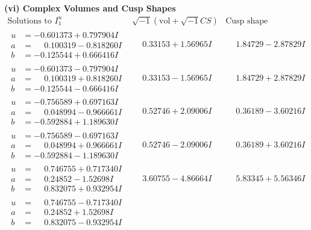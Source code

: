 \documentclass[1p]{elsarticle_modified}
\theoremstyle{definition}
\newcommand{\I}{\sqrt{-1}}
\begin{document}
\newpage\flushleft \textbf{(vi) Complex Volumes and Cusp Shapes}
$$\begin{array}{c|c|c}  
\text{Solutions to }I^u_{1}& \I (\text{vol} + \sqrt{-1}CS) & \text{Cusp shape}\\
 \hline 
\begin{aligned}
u &= -0.601373 + 0.797904 I \\
a &= \phantom{-}0.100319 - 0.818260 I \\
b &= -0.125544 + 0.666416 I\end{aligned}
 & \phantom{-}0.33153 + 1.56965 I & \phantom{-}1.84729 - 2.87829 I \\ \hline\begin{aligned}
u &= -0.601373 - 0.797904 I \\
a &= \phantom{-}0.100319 + 0.818260 I \\
b &= -0.125544 - 0.666416 I\end{aligned}
 & \phantom{-}0.33153 - 1.56965 I & \phantom{-}1.84729 + 2.87829 I \\ \hline\begin{aligned}
u &= -0.756589 + 0.697163 I \\
a &= \phantom{-}0.048994 - 0.966661 I \\
b &= -0.592884 + 1.189630 I\end{aligned}
 & \phantom{-}0.52746 + 2.09006 I & \phantom{-}0.36189 - 3.60216 I \\ \hline\begin{aligned}
u &= -0.756589 - 0.697163 I \\
a &= \phantom{-}0.048994 + 0.966661 I \\
b &= -0.592884 - 1.189630 I\end{aligned}
 & \phantom{-}0.52746 - 2.09006 I & \phantom{-}0.36189 + 3.60216 I \\ \hline\begin{aligned}
u &= \phantom{-}0.746755 + 0.717340 I \\
a &= \phantom{-}0.24852 - 1.52698 I \\
b &= \phantom{-}0.832075 + 0.932954 I\end{aligned}
 & \phantom{-}3.60755 - 4.86664 I & \phantom{-}5.83345 + 5.56346 I \\ \hline\begin{aligned}
u &= \phantom{-}0.746755 - 0.717340 I \\
a &= \phantom{-}0.24852 + 1.52698 I \\
b &= \phantom{-}0.832075 - 0.932954 I\end{aligned}

\end{array}$$
\end{document}
